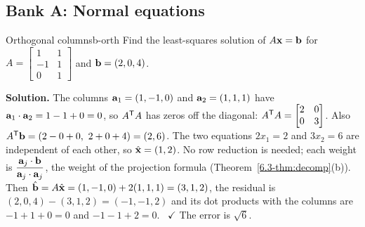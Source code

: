 \documentclass[11pt]{article}
\begin{document}
\subsection*{Bank A: Normal equations}
\begin{exmp}{Orthogonal columns}{b-orth}
Find the least-squares solution of $A\mathbf{x}=\mathbf{b}$ for $A=\begin{bmatrix}1&1\\-1&1\\0&1\end{bmatrix}$ and $\mathbf{b}=(2,0,4)$.

\textbf{Solution.} The columns $\mathbf{a}_1=(1,-1,0)$ and $\mathbf{a}_2=(1,1,1)$ have $\mathbf{a}_1\cdot\mathbf{a}_2=1-1+0=0$, so $A^{\mathsf T} A$ has zeros off the diagonal: $A^{\mathsf T} A=\begin{bmatrix}2&0\\0&3\end{bmatrix}$. Also $A^{\mathsf T}\mathbf{b}=(2-0+0,\ 2+0+4)=(2,6)$. The two equations $2x_1=2$ and $3x_2=6$ are independent of each other, so $\hat{\mathbf{x}}=(1,2)$. No row reduction is needed; each weight is $\dfrac{\mathbf{a}_j\cdot\mathbf{b}}{\mathbf{a}_j\cdot\mathbf{a}_j}$, the weight of the projection formula (Theorem~\ref{6.3-thm:decomp}(b)). Then $\hat{\mathbf{b}}=A\hat{\mathbf{x}}=(1,-1,0)+2(1,1,1)=(3,1,2)$, the residual is $(2,0,4)-(3,1,2)=(-1,-1,2)$ and its dot products with the columns are $-1+1+0=0$ and $-1-1+2=0$. \ $\checkmark$ The error is $\sqrt6$.
\end{exmp}
\end{document}
